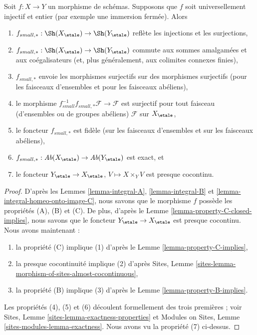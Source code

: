 \begin{lemma}
\label{lemma-integral-universally-injective}
Soit $f : X \to Y$ un morphisme de sch\'emas. Supposons que $f$ soit
universellement injectif et entier (par exemple une immersion ferm\'ee).
Alors
\begin{enumerate}
\item
$f_{small, *} :
\Sh(X_\etale)
\to
\Sh(Y_\etale)$
refl\`ete les injections et les surjections,
\item
$f_{small, *} :
\Sh(X_\etale)
\to
\Sh(Y_\etale)$
commute aux sommes amalgam\'ees et aux co\'egalisateurs (et, plus g\'en\'eralement,
aux colimites connexes finies),
\item $f_{small, *}$ envoie les morphismes surjectifs sur des morphismes surjectifs (pour les faisceaux
d'ensembles et pour les faisceaux ab\'eliens),
\item le morphisme
$f_{small}^{-1}f_{small, *}\mathcal{F} \to \mathcal{F}$
est surjectif pour tout faisceau (d'ensembles ou de groupes ab\'eliens)
$\mathcal{F}$ sur $X_\etale$,
\item le foncteur $f_{small, *}$ est fid\`ele (sur les faisceaux d'ensembles et
sur les faisceaux ab\'eliens),
\item
$f_{small, *} :
\textit{Ab}(X_\etale)
\to
\textit{Ab}(Y_\etale)$
est exact, et
\item le foncteur
$Y_\etale \to X_\etale$, $V \mapsto X \times_Y V$ est
presque cocontinu.
\end{enumerate}
\end{lemma}

\begin{proof}
D'apr\`es les
Lemmes \ref{lemma-integral-A},
\ref{lemma-integral-B} et
\ref{lemma-integral-homeo-onto-image-C},
nous savons que le morphisme $f$ poss\`ede les propri\'et\'es (A), (B) et (C).
De plus, d'apr\`es le
Lemme \ref{lemma-property-C-closed-implies},
nous savons que le foncteur $Y_\etale \to X_\etale$ est
presque cocontinu. Nous avons maintenant :
\begin{enumerate}
\item la propri\'et\'e (C) implique (1) d'apr\`es le
Lemme \ref{lemma-property-C-implies},
\item la presque cocontinuit\'e implique (2) d'apr\`es
Sites, Lemme \ref{sites-lemma-morphism-of-sites-almost-cocontinuous},
\item la propri\'et\'e (B) implique (3) d'apr\`es le
Lemme \ref{lemma-property-B-implies}.
\end{enumerate}
Les propri\'et\'es (4), (5) et (6) d\'ecoulent formellement des trois premi\`eres ; voir
Sites, Lemme \ref{sites-lemma-exactness-properties}
et
Modules on Sites, Lemme \ref{sites-modules-lemma-exactness}.
Nous avons vu la propri\'et\'e (7) ci-dessus.
\end{proof}




